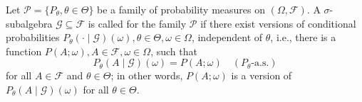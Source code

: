 Let $\mathcal{P} = \{P_{\theta}, \theta \in \Theta\}$ be a family of probability measures on $(\Omega, \mathcal{F})$. A $\sigma$-subalgebra $\mathcal{G} \subseteq \mathcal{F}$ is called  for the family $\mathcal{P}$ if there exist versions of conditional probabilities $P_{\theta}(\cdot \mid \mathcal{G})(\omega), \theta \in \Theta, \omega \in \Omega$, independent of $\theta$, i.e., there is a function $P(A; \omega), A \in \mathcal{F}, \omega \in \Omega$, such that
$$P_{\theta}(A \mid \mathcal{G})(\omega) = P(A; \omega) \quad (P_{\theta}\text{-a.s.})$$
for all $A \in \mathcal{F}$ and $\theta \in \Theta$; in other words, $P(A; \omega)$ is a version of $P_{\theta}(A \mid \mathcal{G})(\omega)$ for all $\theta \in \Theta$.
